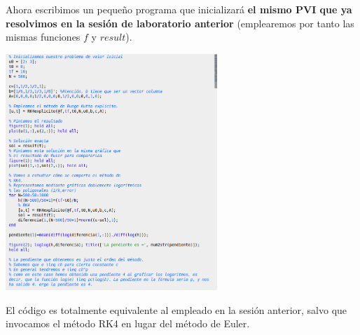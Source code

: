 Ahora escribimos un pequeño programa que inicializará \textbf{el mismo PVI que ya resolvimos en la sesión de laboratorio anterior} (emplearemos por tanto las mismas funciones $f$ y $result$).
\begin{center}
\includegraphics[width=0.6\textwidth]{img/PVI_RK4_explicito.png}
\end{center}

El código es totalmente equivalente al empleado en la sesión anterior, salvo que invocamos el método RK4 en lugar del método de Euler.

